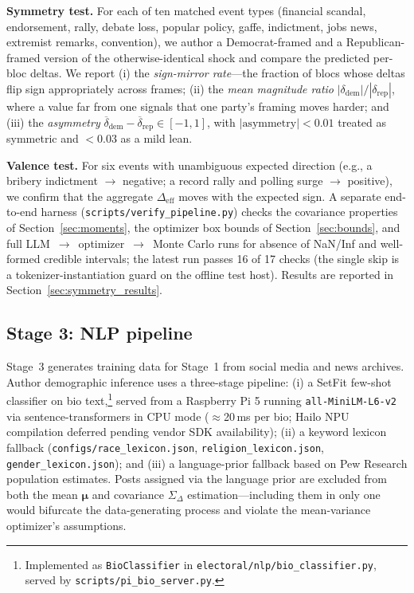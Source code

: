 \documentclass[12pt, letterpaper]{article}
\theoremstyle{definition}
\newcommand{\SigmaDelta}{\Sigma_{\Delta}}
\newcommand{\boldmu}{\boldsymbol{\mu}}
\begin{document}
\textbf{Symmetry test.} For each of ten matched event types (financial scandal,
endorsement, rally, debate loss, popular policy, gaffe, indictment, jobs news,
extremist remarks, convention), we author a Democrat-framed and a Republican-framed
version of the otherwise-identical shock and compare the predicted per-bloc deltas. We
report (i) the \emph{sign-mirror rate}---the fraction of blocs whose deltas flip sign
appropriately across frames; (ii) the \emph{mean magnitude ratio}
$|\delta_{\text{dem}}| / |\delta_{\text{rep}}|$, where a value far from one signals that
one party's framing moves harder; and (iii) the \emph{asymmetry}
$\overline{\delta}_{\text{dem}} - \overline{\delta}_{\text{rep}} \in [-1, 1]$, with
$|\text{asymmetry}| < 0.01$ treated as symmetric and $< 0.03$ as a mild lean.

\textbf{Valence test.} For six events with unambiguous expected direction (e.g., a
bribery indictment $\rightarrow$ negative; a record rally and polling surge
$\rightarrow$ positive), we confirm that the aggregate $\Delta_{\mathrm{eff}}$ moves
with the expected sign. A separate end-to-end harness
(\texttt{scripts/verify\_pipeline.py}) checks the covariance properties of
Section~\ref{sec:moments}, the optimizer box bounds of Section~\ref{sec:bounds}, and
full LLM~$\rightarrow$~optimizer~$\rightarrow$~Monte Carlo runs for absence of NaN/Inf
and well-formed credible intervals; the latest run passes 16 of 17 checks (the single
skip is a tokenizer-instantiation guard on the offline test host). Results are reported
in Section~\ref{sec:symmetry_results}.

\subsection{Stage 3: NLP pipeline}
\label{sec:nlp}

Stage~3 generates training data for Stage~1 from social media and news archives.
Author demographic inference uses a three-stage pipeline: (i) a SetFit
few-shot classifier \citep{Tunstall2022} on bio text,\footnote{Implemented as
\texttt{BioClassifier} in \texttt{electoral/nlp/bio\_classifier.py}, served by
\texttt{scripts/pi\_bio\_server.py}.} served from a
Raspberry Pi 5 running \texttt{all-MiniLM-L6-v2} via sentence-transformers
in CPU mode ($\approx$20\,ms per bio; Hailo NPU compilation deferred
pending vendor SDK availability); (ii) a keyword lexicon fallback
(\texttt{configs/race\_lexicon.json}, \texttt{religion\_lexicon.json},
\texttt{gender\_lexicon.json}); and (iii) a language-prior fallback based
on Pew Research population estimates. Posts assigned via the language prior
are excluded from both the mean $\boldmu$ and covariance $\SigmaDelta$
estimation---including them in only one would bifurcate the data-generating
process and violate the mean-variance optimizer's assumptions.
\end{document}

